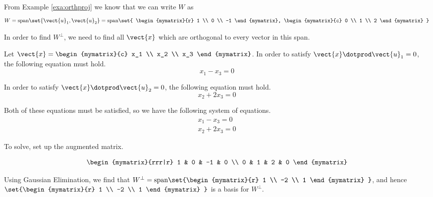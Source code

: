 \begin{solution}

From Example \ref{exa:orthproj} we know that we can write $W$ as 
\[
W = \mbox{span} \set{\vect{u}_1, \vect{u}_2 } = \mbox{span} 
\set{
\begin{mymatrix}{r}
1 \\
0 \\
-1
\end{mymatrix},
\begin{mymatrix}{c}
0 \\
1 \\
2
\end{mymatrix}
}
\]

In order to find $W^{\perp}$, we need to find all $\vect{x}$ which are orthogonal to every vector in this span. 

Let $\vect{x} = \begin{mymatrix}{c}
x_1 \\
x_2 \\
x_3
\end{mymatrix}$. 
In order to satisfy $\vect{x} \dotprod \vect{u}_1 = 0$, the following equation must hold. 
\[
x_1 - x_3 = 0
\]

In order to satisfy $\vect{x} \dotprod \vect{u}_2 = 0$, the following equation must hold.
\[
x_2 + 2x_3 = 0 
\]

Both of these equations must be satisfied, so we have the following system of equations. 
\[
\begin{array}{c}
x_1 - x_3 = 0 \\
x_2 + 2x_3 = 0
\end{array}
\]

To solve, set up the augmented matrix. 

\[
\begin{mymatrix}{rrr|r}
1 & 0 & -1 & 0 \\
0 & 1 & 2 & 0 
\end{mymatrix}
\]

Using Gaussian Elimination, we find that $W^{\perp} = \mbox{span} \set{\begin{mymatrix}{r}
1 \\
-2 \\
1
\end{mymatrix}
}$, and hence 
$\set{\begin{mymatrix}{r}
1 \\
-2 \\
1
\end{mymatrix}
}$ is a basis for  $W^{\perp}$. 
\end{solution}

